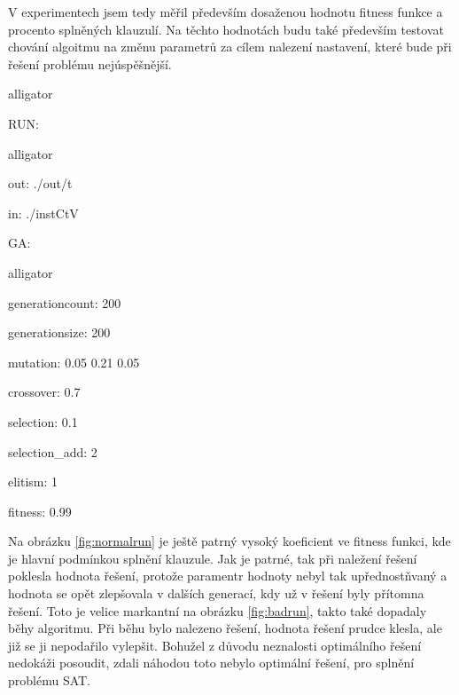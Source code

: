 \documentclass[11pt]{article}
\begin{document}
V experimentech jsem tedy měřil především dosaženou hodnotu fitness funkce a procento spl\-něných klauzulí. Na těchto hodnotách budu také především testovat chování algoitmu na změnu parametrů za cílem nalezení nastavení, které bude při řešení problému nejúspěšnější. 

\begin{labeling}{alligator}
\item[RUN:] 
\begin{labeling}{alligator}
\item[] 
\item[out:] ./out/t
\item[in:] ./instCtV
\end{labeling}
\item[GA:]
\begin{labeling}{alligator}
\item[] 
\item[generationcount:] 200
\item[generationsize:] 200
\item[mutation:] 0.05 0.21 0.05
\item[crossover:] 0.7
\item[selection:] 0.1
\item[selection\_add:] 2
\item[elitism:] 1
\item[fitness:] 0.99
\end{labeling}  
\end{labeling}
\pagestyle{plain}

Na obrázku \ref{fig:normalrun} je ještě patrný vysoký koeficient ve fitness funkci, kde je hlavní podmínkou splnění klauzule. Jak je patrné, tak při naležení řešení poklesla hodnota řešení, protože paramentr hodnoty nebyl tak upřednostňvaný a hodnota se opět zlepšovala v dalších generací, kdy už v řešení byly přítomna řešení. Toto je velice markantní na obrázku \ref{fig:badrun}, takto také dopadaly běhy algoritmu. Při běhu bylo nalezeno řešení, hodnota řešení prudce klesla, ale již se ji nepodařilo vylepšit. Bohužel z důvodu neznalosti optimálního řešení nedokáži posoudit, zdali náhodou toto nebylo optimální řešení, pro splnění problému SAT.
\end{document}
